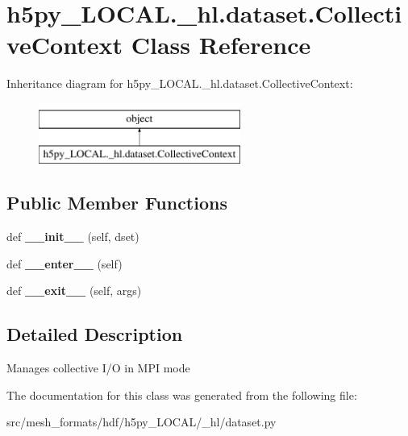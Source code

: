 \hypertarget{classh5py__LOCAL_1_1__hl_1_1dataset_1_1CollectiveContext}{}\section{h5py\+\_\+\+L\+O\+C\+A\+L.\+\_\+hl.\+dataset.\+Collective\+Context Class Reference}
\label{classh5py__LOCAL_1_1__hl_1_1dataset_1_1CollectiveContext}
Inheritance diagram for h5py\+\_\+\+L\+O\+C\+A\+L.\+\_\+hl.\+dataset.\+Collective\+Context\+:\begin{figure}[H]
\begin{center}
\leavevmode
\includegraphics[height=2.000000cm]{classh5py__LOCAL_1_1__hl_1_1dataset_1_1CollectiveContext}
\end{center}
\end{figure}
\subsection*{Public Member Functions}
\begin{DoxyCompactItemize}
\item 
\mbox{\label{classh5py__LOCAL_1_1__hl_1_1dataset_1_1CollectiveContext_ae491974e5598f32ee55de925650f88e2}} 
def {\bfseries \+\_\+\+\_\+init\+\_\+\+\_\+} (self, dset)
\item 
\mbox{\label{classh5py__LOCAL_1_1__hl_1_1dataset_1_1CollectiveContext_adb2bcdfcd25e8c86774c1b93939a7bb9}} 
def {\bfseries \+\_\+\+\_\+enter\+\_\+\+\_\+} (self)
\item 
\mbox{\label{classh5py__LOCAL_1_1__hl_1_1dataset_1_1CollectiveContext_ae589bfa857261db843c670a1d6d92c2d}} 
def {\bfseries \+\_\+\+\_\+exit\+\_\+\+\_\+} (self, args)
\end{DoxyCompactItemize}


\subsection{Detailed Description}
\begin{DoxyVerb}Manages collective I/O in MPI mode \end{DoxyVerb}
 

The documentation for this class was generated from the following file\+:\begin{DoxyCompactItemize}
\item 
src/mesh\+\_\+formats/hdf/h5py\+\_\+\+L\+O\+C\+A\+L/\+\_\+hl/dataset.\+py\end{DoxyCompactItemize}
